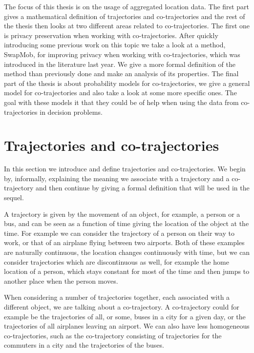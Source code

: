 \documentclass[12pt]{article}
\theoremstyle{definition}
\begin{document}
The focus of this thesis is on the usage of aggregated location data.
The first part gives a mathematical definition of trajectories and
co-trajectories and the rest of the thesis then looks at two different
areas related to co-trajectories. The first one is privacy
preservation when working with co-trajectories. After quickly
introducing some previous work on this topic we take a look at a
method, SwapMob, for improving privacy when working with
co-trajectories, which was introduced in the literature last year. We
give a more formal definition of the method than previously done and
make an analysis of its properties. The final part of the thesis is
about probability models for co-trajectories, we give a general model
for co-trajectories and also take a look at some more specific ones.
The goal with these models it that they could be of help when using
the data from co-trajectories in decision problems.

\section{Trajectories and co-trajectories}
\label{sec:traj-and-co-traj}
In this section we introduce and define trajectories and
co-trajectories. We begin by, informally, explaining the meaning we
associate with a trajectory and a co-trajectory and then continue by
giving a formal definition that will be used in the sequel.

A trajectory is given by the movement of an object, for example, a
person or a bus, and can be seen as a function of time giving the
location of the object at the time. For example we can consider the
trajectory of a person on their way to work, or that of an airplane
flying between two airports. Both of these examples are naturally
continuous, the location changes continuously with time, but we can
consider trajectories which are discontinuous as well, for example the
home location of a person, which stays constant for most of the time
and then jumps to another place when the person moves.

When considering a number of trajectories together, each associated
with a different object, we are talking about a co-trajectory. A
co-trajectory could for example be the trajectories of all, or some,
buses in a city for a given day, or the trajectories of all airplanes
leaving an airport. We can also have less homogeneous co-trajectories,
such as the co-trajectory consisting of trajectories for the commuters
in a city and the trajectories of the buses.
\end{document}
